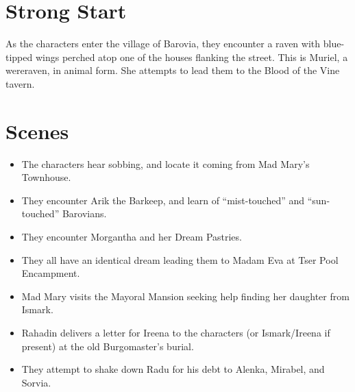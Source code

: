 \documentclass[a4paper,11pt]{article}
\begin{document}
\pagebreak
\section{Strong Start}
\label{sec:StrongStart}
As the characters enter the village of Barovia, they encounter a raven with blue-tipped wings perched atop one of
the houses flanking the street. This is Muriel, a wereraven, in animal form. She attempts to lead them to the
Blood of the Vine tavern.

\section{Scenes}
\label{sec:Scenes}
\begin{itemize}
  \item The characters hear sobbing, and locate it coming from Mad Mary's Townhouse.
  \item They encounter Arik the Barkeep, and learn of ``mist-touched'' and ``sun-touched'' Barovians.
  \item They encounter Morgantha and her Dream Pastries.
  \item They all have an identical dream leading them to Madam Eva at Tser Pool Encampment.
  \item Mad Mary visits the Mayoral Mansion seeking help finding her daughter from Ismark.
  \item Rahadin delivers a letter for Ireena to the characters (or Ismark/Ireena if present) at the old 
  Burgomaster's burial.
  \item They attempt to shake down Radu for his debt to Alenka, Mirabel, and Sorvia.
\end{itemize}
\end{document}
